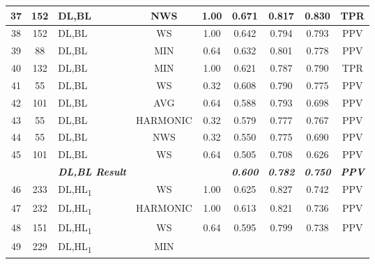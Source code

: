 \begin{table}[H]
{\begin{tabular}{cc|l|cc|c|c|c|c|}
  \multicolumn{1}{|c|}{37} &
    152 &
    DL,BL &
    \multicolumn{1}{c|}{NWS} &
    1.00 &
    0.671 &
    0.817 &
    0.830 &
    TPR \\ \hline
  \multicolumn{1}{|c|}{38} &
    152 &
    DL,BL &
    \multicolumn{1}{c|}{WS} &
    1.00 &
    0.642 &
    0.794 &
    0.793 &
    PPV \\ \hline
  \multicolumn{1}{|c|}{39} &
    88 &
    DL,BL &
    \multicolumn{1}{c|}{MIN} &
    0.64 &
    0.632 &
    0.801 &
    0.778 &
    PPV \\ \hline
  \multicolumn{1}{|c|}{40} &
    132 &
    DL,BL &
    \multicolumn{1}{c|}{MIN} &
    1.00 &
    0.621 &
    0.787 &
    0.790 &
    TPR \\ \hline
  \multicolumn{1}{|c|}{41} &
    55 &
    DL,BL &
    \multicolumn{1}{c|}{WS} &
    0.32 &
    0.608 &
    0.790 &
    0.775 &
    PPV \\ \hline
  \multicolumn{1}{|c|}{42} &
    101 &
    DL,BL &
    \multicolumn{1}{c|}{AVG} &
    0.64 &
    0.588 &
    0.793 &
    0.698 &
    PPV \\ \hline
  \multicolumn{1}{|c|}{43} &
    55 &
    DL,BL &
    \multicolumn{1}{c|}{HARMONIC} &
    0.32 &
    0.579 &
    0.777 &
    0.767 &
    PPV \\ \hline
  \multicolumn{1}{|c|}{44} &
    55 &
    DL,BL &
    \multicolumn{1}{c|}{NWS} &
    0.32 &
    0.550 &
    0.775 &
    0.690 &
    PPV \\ \hline
  \multicolumn{1}{|c|}{45} &
    101 &
    DL,BL &
    \multicolumn{1}{c|}{WS} &
    0.64 &
    0.505 &
    0.708 &
    0.626 &
    PPV \\ \hline
   &
     &
    \textit{\textbf{DL,BL Result}} &
     &
     &
    \textit{\textbf{0.600}} &
    \textit{\textbf{0.782}} &
    \textit{\textbf{0.750}} &
    \textit{\textbf{PPV}} \\ \hline
  \multicolumn{1}{|c|}{46} &
    233 &
    DL,HL\textsubscript{1} &
    \multicolumn{1}{c|}{WS} &
    1.00 &
    0.625 &
    0.827 &
    0.742 &
    PPV \\ \hline
  \multicolumn{1}{|c|}{47} &
    232 &
    DL,HL\textsubscript{1} &
    \multicolumn{1}{c|}{HARMONIC} &
    1.00 &
    0.613 &
    0.821 &
    0.736 &
    PPV \\ \hline
  \multicolumn{1}{|c|}{48} &
    151 &
    DL,HL\textsubscript{1} &
    \multicolumn{1}{c|}{WS} &
    0.64 &
    0.595 &
    0.799 &
    0.738 &
    PPV \\ \hline
  \multicolumn{1}{|c|}{49} &
    229 &
    DL,HL\textsubscript{1} &
    \multicolumn{1}{c|}{MIN} &

\end{tabular}}
\end{table}

